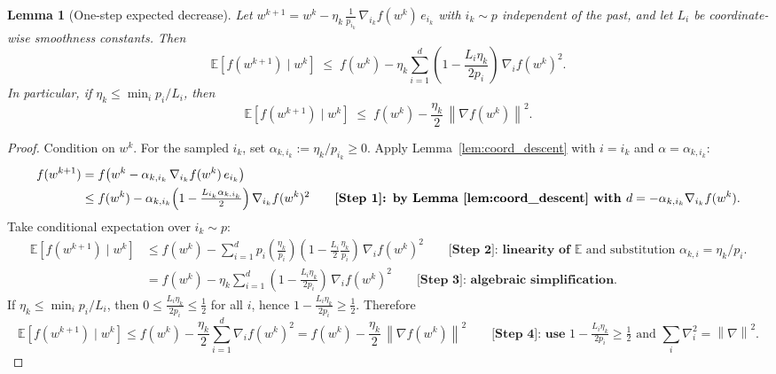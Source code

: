 \documentclass[11pt]{article}
\newtheorem{lemma}{Lemma}
\newcommand{\E}{\mathbb{E}}
\newcommand{\1}{\mathbbm{1}}
\newcommand{\norm}[1]{\left\lVert #1 \right\rVert}
\begin{document}
\begin{lemma}[One-step expected decrease]
\label{lem:one_step}
Let $w^{k+1}=w^k - \eta_k\,\frac{1}{p_{i_k}}\,\nabla_{i_k} f(w^k)\,e_{i_k}$ with $i_k\sim p$ independent of the past, and let $L_i$ be coordinate-wise smoothness constants. Then
\[
\E\!\left[f(w^{k+1}) \mid w^k\right]
\;\le\;
f(w^k) - \eta_k \sum_{i=1}^d \left(1 - \frac{L_i\eta_k}{2p_i}\right)\,\nabla_i f(w^k)^2.
\]
In particular, if $\eta_k \le \min_i p_i/L_i$, then
\[
\E\!\left[f(w^{k+1}) \mid w^k\right]
\;\le\;
f(w^k) - \frac{\eta_k}{2}\,\norm{\nabla f(w^k)}^2.
\]
\end{lemma}
\begin{proof}
Condition on $w^k$. For the sampled $i_k$, set $\alpha_{k,i_k}:=\eta_k/p_{i_k}\ge 0$. Apply Lemma~\ref{lem:coord_descent} with $i=i_k$ and $\alpha=\alpha_{k,i_k}$:
\begin{align*}
f(w^{k+1})
&= f\!\left(w^k - \alpha_{k,i_k}\,\nabla_{i_k} f(w^k)\,e_{i_k}\right)
\\
&\le f(w^k) - \alpha_{k,i_k}\Bigl(1-\tfrac{L_{i_k}\alpha_{k,i_k}}{2}\Bigr)\,\nabla_{i_k} f(w^k)^2
\qquad\textbf{[Step 1]: by Lemma \ref{lem:coord_descent} with } d=-\alpha_{k,i_k}\nabla_{i_k} f(w^k).
\end{align*}
Take conditional expectation over $i_k\sim p$:
\begin{align*}
\E\!\left[f(w^{k+1}) \mid w^k\right]
&\le f(w^k) - \sum_{i=1}^d p_i \left(\frac{\eta_k}{p_i}\right)\left(1-\frac{L_i}{2}\frac{\eta_k}{p_i}\right)\,\nabla_i f(w^k)^2
\qquad\textbf{[Step 2]: linearity of }\E\text{ and substitution } \alpha_{k,i}=\eta_k/p_i.
\\
&= f(w^k) - \eta_k \sum_{i=1}^d \left(1-\frac{L_i\eta_k}{2p_i}\right)\,\nabla_i f(w^k)^2
\qquad\textbf{[Step 3]: algebraic simplification}.
\end{align*}
If $\eta_k \le \min_i p_i/L_i$, then $0\le \frac{L_i\eta_k}{2p_i}\le \frac{1}{2}$ for all $i$, hence $1-\frac{L_i\eta_k}{2p_i}\ge \frac{1}{2}$. Therefore
\[
\E\!\left[f(w^{k+1}) \mid w^k\right]
\le f(w^k) - \frac{\eta_k}{2} \sum_{i=1}^d \nabla_i f(w^k)^2
= f(w^k) - \frac{\eta_k}{2}\,\norm{\nabla f(w^k)}^2
\qquad\textbf{[Step 4]: use }1-\tfrac{L_i\eta_k}{2p_i}\ge \tfrac{1}{2}\text{ and }\sum_i \nabla_i^2=\norm{\nabla}^2.
\]
\end{proof}
\end{document}
